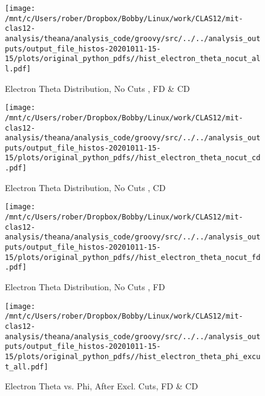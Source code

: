 \documentclass{article}
\begin{document}
\begin{landscape}
    \begin{figure}[h]
        \centering

        \texttt{[image: /mnt/c/Users/rober/Dropbox/Bobby/Linux/work/CLAS12/mit-clas12-analysis/theana/analysis\_code/groovy/src/../../analysis\_outputs/output\_file\_histos-20201011-15-15/plots/original\_python\_pdfs//hist\_electron\_theta\_nocut\_all.pdf]}
        \captionsetup{textformat=empty,labelformat=blank}
        \caption{Electron Theta Distribution, No Cuts , FD \& CD}
    \end{figure}
    \clearpage
    
    \begin{figure}[h]
        \centering

        \texttt{[image: /mnt/c/Users/rober/Dropbox/Bobby/Linux/work/CLAS12/mit-clas12-analysis/theana/analysis\_code/groovy/src/../../analysis\_outputs/output\_file\_histos-20201011-15-15/plots/original\_python\_pdfs//hist\_electron\_theta\_nocut\_cd.pdf]}
        \captionsetup{textformat=empty,labelformat=blank}
        \caption{Electron Theta Distribution, No Cuts , CD}
    \end{figure}
    \clearpage
    
    \begin{figure}[h]
        \centering

        \texttt{[image: /mnt/c/Users/rober/Dropbox/Bobby/Linux/work/CLAS12/mit-clas12-analysis/theana/analysis\_code/groovy/src/../../analysis\_outputs/output\_file\_histos-20201011-15-15/plots/original\_python\_pdfs//hist\_electron\_theta\_nocut\_fd.pdf]}
        \captionsetup{textformat=empty,labelformat=blank}
        \caption{Electron Theta Distribution, No Cuts , FD}
    \end{figure}
    \clearpage
    
    \begin{figure}[h]
        \centering

        \texttt{[image: /mnt/c/Users/rober/Dropbox/Bobby/Linux/work/CLAS12/mit-clas12-analysis/theana/analysis\_code/groovy/src/../../analysis\_outputs/output\_file\_histos-20201011-15-15/plots/original\_python\_pdfs//hist\_electron\_theta\_phi\_excut\_all.pdf]}
        \captionsetup{textformat=empty,labelformat=blank}
        \caption{Electron Theta vs. Phi, After Excl. Cuts, FD \& CD}
    \end{figure}
    \clearpage
    
    \begin{figure}[h]
        \centering


\end{figure}
\end{landscape}
\end{document}
